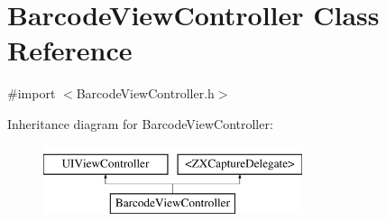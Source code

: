 \hypertarget{interface_barcode_view_controller}{}\section{Barcode\+View\+Controller Class Reference}
\label{interface_barcode_view_controller}


{\ttfamily \#import $<$Barcode\+View\+Controller.\+h$>$}

Inheritance diagram for Barcode\+View\+Controller\+:\begin{figure}[H]
\begin{center}
\leavevmode
\includegraphics[height=2.000000cm]{interface_barcode_view_controller}
\end{center}
\end{figure}
